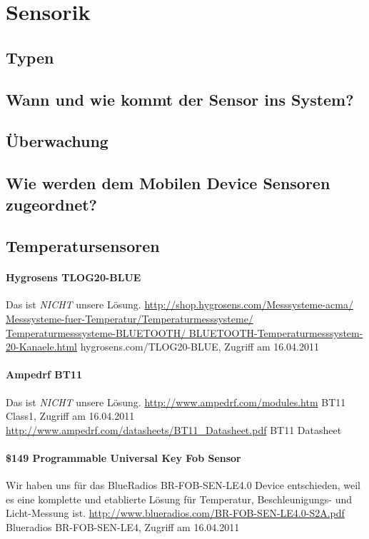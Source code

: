 \section{Sensorik}\label{sensors}

\subsection{Typen}


\subsection{Wann und wie kommt der Sensor ins System?}

\subsection{Überwachung}

\subsection{Wie werden dem Mobilen Device Sensoren zugeordnet?}

\subsection{Temperatursensoren}
	\paragraph{Hygrosens TLOG20-BLUE}
		Das ist \textit{NICHT} unsere Lösung.
		\url{http://shop.hygrosens.com/Messsysteme-acma/
			Messsysteme-fuer-Temperatur/Temperaturmesssysteme/
			Temperaturmesssysteme-BLUETOOTH/
			BLUETOOTH-Temperaturmesssystem-20-Kanaele.html}
			{hygrosens.com/TLOG20-BLUE, Zugriff am 16.04.2011}
	\par
	
	\paragraph{Ampedrf BT11}
		Das ist \textit{NICHT} unsere Lösung.
		\url{http://www.ampedrf.com/modules.htm}
		{BT11 Class1, Zugriff am 16.04.2011}
		\url{http://www.ampedrf.com/datasheets/BT11_Datasheet.pdf}
		{BT11 Datasheet}
	\par 

	\paragraph{\$149 Programmable Universal Key Fob Sensor}
		Wir haben uns für das BlueRadios BR-FOB-SEN-LE4.0 Device  entschieden, weil es
		eine komplette und etablierte Lösung für Temperatur, Beschleunigungs- und
		Licht-Messung ist.
		\url{http://www.blueradios.com/BR-FOB-SEN-LE4.0-S2A.pdf}
		{Blueradios BR-FOB-SEN-LE4, Zugriff am 16.04.2011}
		
